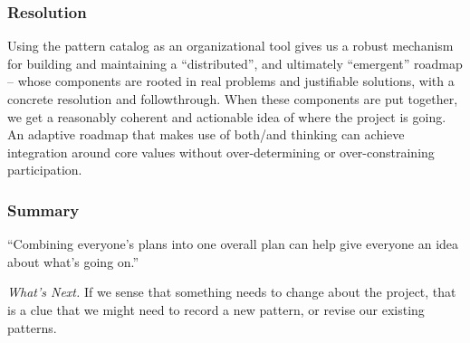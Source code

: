 \subsubsection*{Resolution}
Using the pattern catalog as an
organizational tool gives us a robust mechanism for
building and maintaining a ``distributed'', and ultimately
``emergent'' roadmap -- whose components are rooted in real problems
and justifiable solutions, with a concrete resolution and
followthrough.  When these components are put together, we get a
reasonably coherent and actionable idea of where the project is going.
%
An adaptive roadmap that makes use of both/and thinking can achieve
integration around core values without over-determining or
over-constraining participation.

\subsubsection*{Summary}
``Combining everyone's plans into one overall plan can help give everyone an idea about what's going on.''

\begin{framed}
\noindent
\emph{What's Next.}
If we sense that something needs to change about the project, that is a clue that we might need to record a new pattern, or revise our existing patterns.
\end{framed}

